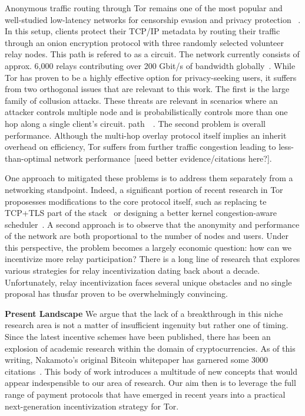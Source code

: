 Anonymous traffic routing through Tor remains one of the most popular and
well-studied low-latency networks for censorship evasion and privacy protection
~\cite{dingledine2004tor}. In this setup, clients protect their TCP/IP metadata
by routing their traffic through an onion encryption protocol with three
randomly selected volunteer relay nodes. This path is refered to as a
circuit. The network currently consists of approx. 6,000 relays contributing
over 200 Gbit/s of bandwidth globally~\cite{portal2018tormetrics}. While Tor has
proven to be a highly effective option for privacy-seeking users, it suffers
from two orthogonal issues that are relevant to this work. The first is the
large family of collusion attacks. These threats are relevant in scenarios where
an attacker controls multiple node and is probabilistically controls more than
one hop along a single client's circuit.
path~\cite{wright2004predecessor}~\cite{murdoch2005low}. The second problem is
overall performance. Although the multi-hop overlay protocol itself implies an
inherit overhead on efficiency, Tor suffers from further traffic congestion
leading to less-than-optimal network
performance~\cite{portal2018tormetrics}[need better evidence/citations here?].

One approach to mitigated these problems is to address them separately from a
networking standpoint. Indeed, a significant portion of recent research in Tor
proposesses modifications to the core protocol itself, such as replacing te TCP+TLS part of the stack~\cite{} or designing a better kernel congestion-aware scheduler~\cite{}. A second approach
is to observe that the anonymity and performance of the network are both
proportional to the number of nodes and users. Under this perspective, the problem becomes
a largely economic question: how can we incentivize more relay participation?
There is a long line of research that explores various strategies for relay
incentivization dating back about a decade. Unfortunately, relay incentivization
faces several unique obstacles and no single proposal has thusfar proven to be
overwhelmingly convincing.

\textbf{Present Landscape} We argue that the lack of a breakthrough in this
niche research area is not a matter of insufficient ingenuity but rather one of
timing. Since the latest incentive schemes have been published, there has been
an explosion of academic research within the domain of cryptocurrencies. As of
this writing, Nakamoto's original Bitcoin whitepaper has garnered some 3000
citations~\cite{nakamoto2008bitcoin}. This body of work introduces a multitude
of new concepts that would appear indespensible to our area of research. Our
aim then is to leverage the full range of payment protocols that have emerged in
recent years into a practical next-generation incentivization strategy for Tor.

